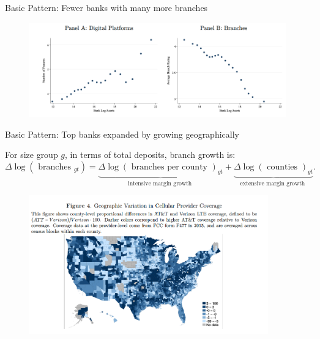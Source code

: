 \documentclass[notes,10pt, aspectratio=169]{beamer}
\begin{document}
    


\begin{frame}{Basic Pattern: Fewer banks with many more branches}

\begin{figure}
    \centering
    \includegraphics[width=0.99\textwidth]{imgs/fig3.png}
    \label{fig:my_label}
\end{figure}

\end{frame}

\begin{frame}{Basic Pattern: Top banks expanded by growing geographically}

    For size group $g$, in terms of total deposits, branch growth is:
$$
\Delta \log \left(\text { branches }_{g t}\right)=\underbrace{\Delta \log (\text { branches per county })_{g t}}_{\text {intensive margin growth }}+\underbrace{\Delta \log (\text { counties })_{g t}}_{\text {extensive margin growth }} .
$$

    \begin{figure}
        \centering
        \includegraphics[width=0.92\textwidth]{imgs/fig4.png}
        \label{fig:my_label}
    \end{figure}
    
    \end{frame}
\end{document}
